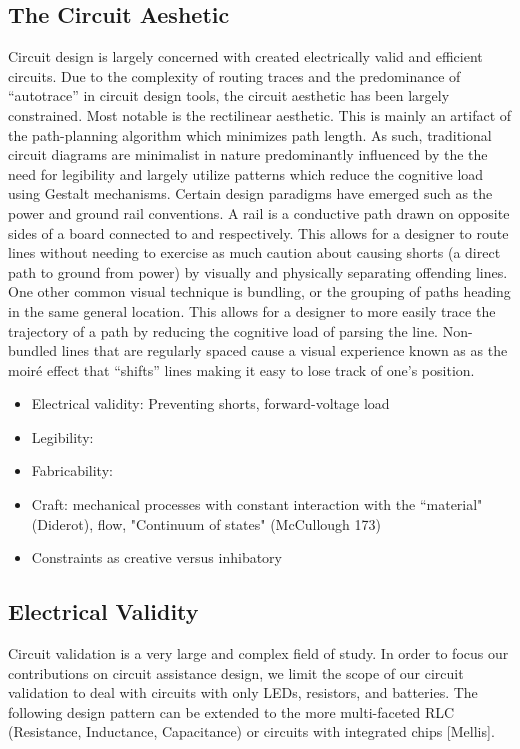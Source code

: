 \documentclass{sigchi}
\begin{document}
    \subsection{The Circuit Aeshetic} Circuit design is largely concerned with created electrically valid and efficient circuits.  Due to the complexity of routing traces and the predominance of ``autotrace'' in circuit design tools, the circuit aesthetic has been largely constrained. Most notable is the rectilinear aesthetic. This is mainly an artifact of the path-planning algorithm which minimizes path length. As such, traditional circuit diagrams are minimalist in nature predominantly influenced by the the need for legibility and largely utilize patterns which reduce the cognitive load using Gestalt mechanisms. Certain design paradigms have emerged such as the power and ground rail conventions. A rail is a conductive path drawn on opposite sides of a board connected to  and  respectively. This allows for a designer to route lines without needing to exercise as much caution about causing shorts (a direct path to ground from power) by visually and physically separating offending lines. One other common visual technique is bundling, or the grouping of paths heading in the same general location. This allows for a designer to more easily trace the trajectory of a path by reducing the cognitive load of parsing the line. Non-bundled lines that are regularly spaced cause a visual experience known as as the moir\'e effect that ``shifts'' lines making it easy to lose track of one's position.



    \begin{itemize}
        \item Electrical validity: Preventing shorts, forward-voltage load
        \item Legibility:
        \item Fabricability:
    \end{itemize}

    \begin{itemize}
        \item Craft: mechanical processes with constant interaction with the ``material" (Diderot), flow, "Continuum of states" (McCullough 173)
        \item Constraints as creative versus inhibatory
    \end{itemize}
    \subsection{Electrical Validity}
     Circuit validation is a very large and complex field of study. In order to focus our contributions on circuit assistance design, we limit the scope of our circuit validation to deal with circuits with only LEDs, resistors, and batteries. The following design pattern can be extended to the more multi-faceted RLC (Resistance, Inductance, Capacitance) or circuits with integrated chips [Mellis].
\end{document}
